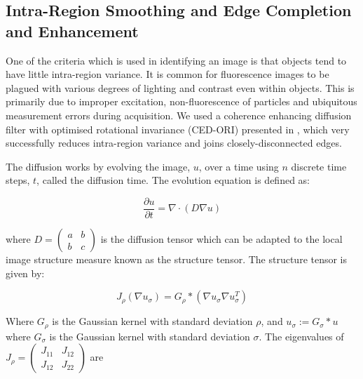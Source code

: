 


\subsection{Intra-Region Smoothing and Edge Completion and Enhancement}
\label{sec:Diffusion}

One of the criteria which is used in identifying an image is that objects tend to have little intra-region variance.
It is common for fluorescence images to be plagued with various degrees of lighting and contrast even within objects. This is primarily due to improper excitation, non-fluorescence of particles and ubiquitous measurement errors during acquisition.
We used a coherence enhancing diffusion filter with optimised rotational invariance (CED-ORI) presented in \citep{Weickert1999,Weickert2002,Weickert2003}, which very successfully reduces intra-region variance and joins closely-disconnected edges.

The diffusion works by evolving the image, $u$, over a time using $n$ discrete time steps, $t$, called the diffusion time. The evolution equation is defined as:

\begin{equation}
\frac{\partial u}{\partial t} = \nabla \cdot (D\nabla u)
\end{equation}

where $D = \begin{pmatrix}
a & b \\
b & c
\end{pmatrix}$ is the diffusion tensor which can be adapted to the local image structure measure known as the structure tensor. The structure tensor is given by:

\begin{equation}
J_{\rho}(\nabla u_{\sigma}) = G_{\rho} \ast (\nabla u_{\sigma} \nabla u_{\sigma}^T)
\end{equation}

Where $G_{\rho}$ is the Gaussian kernel with standard deviation $\rho$, and $u_{\sigma} := G_{\sigma} \ast u$ where $G_{\sigma}$ is the Gaussian kernel with standard deviation $\sigma$.
The eigenvalues of $J_{\rho}=\begin{pmatrix}
J_{11} & J_{12} \\
J_{12} & J_{22}
\end{pmatrix}$ are

